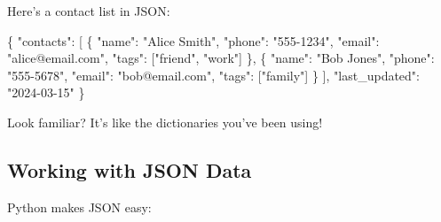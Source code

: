 \documentclass[
  letterpaper,
  DIV=11,
  numbers=noendperiod,
  oneside]{scrreprt}
\newenvironment{Shaded}{}{}
\newcommand{\DataTypeTok}[1]{\textcolor[rgb]{0.84,0.23,0.29}{#1}}
\newcommand{\FunctionTok}[1]{\textcolor[rgb]{0.44,0.26,0.76}{#1}}
\newcommand{\OtherTok}[1]{\textcolor[rgb]{0.44,0.26,0.76}{#1}}
\newcommand{\StringTok}[1]{\textcolor[rgb]{0.01,0.18,0.38}{#1}}
\begin{document}
Here's a contact list in JSON:

\begin{Shaded}
\begin{Highlighting}[]
\FunctionTok{\{}
    \DataTypeTok{"contacts"}\FunctionTok{:} \OtherTok{[}
        \FunctionTok{\{}
            \DataTypeTok{"name"}\FunctionTok{:} \StringTok{"Alice Smith"}\FunctionTok{,}
            \DataTypeTok{"phone"}\FunctionTok{:} \StringTok{"555{-}1234"}\FunctionTok{,}
            \DataTypeTok{"email"}\FunctionTok{:} \StringTok{"alice@email.com"}\FunctionTok{,}
            \DataTypeTok{"tags"}\FunctionTok{:} \OtherTok{[}\StringTok{"friend"}\OtherTok{,} \StringTok{"work"}\OtherTok{]}
        \FunctionTok{\}}\OtherTok{,}
        \FunctionTok{\{}
            \DataTypeTok{"name"}\FunctionTok{:} \StringTok{"Bob Jones"}\FunctionTok{,}
            \DataTypeTok{"phone"}\FunctionTok{:} \StringTok{"555{-}5678"}\FunctionTok{,}
            \DataTypeTok{"email"}\FunctionTok{:} \StringTok{"bob@email.com"}\FunctionTok{,}
            \DataTypeTok{"tags"}\FunctionTok{:} \OtherTok{[}\StringTok{"family"}\OtherTok{]}
        \FunctionTok{\}}
    \OtherTok{]}\FunctionTok{,}
    \DataTypeTok{"last\_updated"}\FunctionTok{:} \StringTok{"2024{-}03{-}15"}
\FunctionTok{\}}
\end{Highlighting}
\end{Shaded}

Look familiar? It's like the dictionaries you've been using!

\subsection{Working with JSON Data}\label{working-with-json-data}

Python makes JSON easy:
\end{document}
